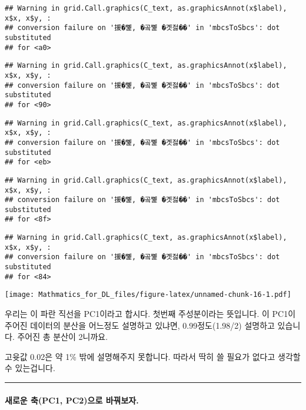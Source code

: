 \documentclass[
]{article}
\begin{document}
\begin{verbatim}
## Warning in grid.Call.graphics(C_text, as.graphicsAnnot(x$label), x$x, x$y, :
## conversion failure on '援�뼱, �곸뼱 �곗젏��' in 'mbcsToSbcs': dot substituted
## for <a0>
\end{verbatim}

\begin{verbatim}
## Warning in grid.Call.graphics(C_text, as.graphicsAnnot(x$label), x$x, x$y, :
## conversion failure on '援�뼱, �곸뼱 �곗젏��' in 'mbcsToSbcs': dot substituted
## for <90>
\end{verbatim}

\begin{verbatim}
## Warning in grid.Call.graphics(C_text, as.graphicsAnnot(x$label), x$x, x$y, :
## conversion failure on '援�뼱, �곸뼱 �곗젏��' in 'mbcsToSbcs': dot substituted
## for <eb>
\end{verbatim}

\begin{verbatim}
## Warning in grid.Call.graphics(C_text, as.graphicsAnnot(x$label), x$x, x$y, :
## conversion failure on '援�뼱, �곸뼱 �곗젏��' in 'mbcsToSbcs': dot substituted
## for <8f>
\end{verbatim}

\begin{verbatim}
## Warning in grid.Call.graphics(C_text, as.graphicsAnnot(x$label), x$x, x$y, :
## conversion failure on '援�뼱, �곸뼱 �곗젏��' in 'mbcsToSbcs': dot substituted
## for <84>
\end{verbatim}

\texttt{[image: Mathmatics\_for\_DL\_files/figure-latex/unnamed-chunk-16-1.pdf]}

우리는 이 파란 직선을 PC1이라고 합시다. 첫번째 주성분이라는 뜻입니다. 이
PC1이 주어진 데이터의 분산을 어느정도 설명하고 있냐면, 0.99정도(1.98/2)
설명하고 있습니다. 주어진 총 분산이 2니까요.

고윳값 0.02은 약 1\% 밖에 설명해주지 못합니다. 따라서 딱히 쓸 필요가
없다고 생각할 수 있는겁니다.

\begin{center}\rule{0.5\linewidth}{0.5pt}\end{center}

\hypertarget{uxc0c8uxb85cuxc6b4-uxcd95pc1-pc2uxc73cuxb85c-uxbc14uxafd4uxbcf4uxc790.}{%
\paragraph{새로운 축(PC1, PC2)으로
바꿔보자.}\label{uxc0c8uxb85cuxc6b4-uxcd95pc1-pc2uxc73cuxb85c-uxbc14uxafd4uxbcf4uxc790.}}
\end{document}
